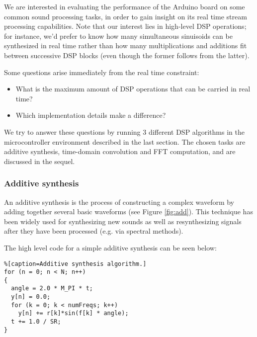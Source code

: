 
We are interested in evaluating the performance of the Arduino board on some common sound processing tasks, in order to gain insight on its real time stream processing capabilities.
Note that our interest lies
in high-level DSP operations; for instance, we'd prefer to know how many simultaneous sinuisoids can
be synthesized in real time rather than how many multiplications
and additions fit between successive DSP blocks (even though the former follows from
the latter).

Some questions arise immediately from the real time constraint:

\begin{itemize}
    \item What is the maximum amount of DSP operations that can be carried in real
    time?
    \item Which implementation details make a difference?
\end{itemize}

We try to answer these questions by running 3 different DSP algorithms in the
microcontroller environment described in the last section. The chosen tasks are additive synthesis, time-domain convolution and FFT computation, and are discussed in the sequel.

\subsubsection{Additive synthesis}

An additive synthesis is the process of constructing a complex waveform
by adding together several basic waveforms (see Figure \ref{fig:add}).
This technique has been widely used for synthesizing new sounds as well as
resynthesizing signals after they have been processed (e.g. via spectral methods).


The high level code for a simple additive synthesis can be seen below:

\begin{lstlisting}%[caption=Additive synthesis algorithm.]
for (n = 0; n < N; n++)
{
  angle = 2.0 * M_PI * t;
  y[n] = 0.0;
  for (k = 0; k < numFreqs; k++)
    y[n] += r[k]*sin(f[k] * angle);
  t += 1.0 / SR;
}
\end{lstlisting}

